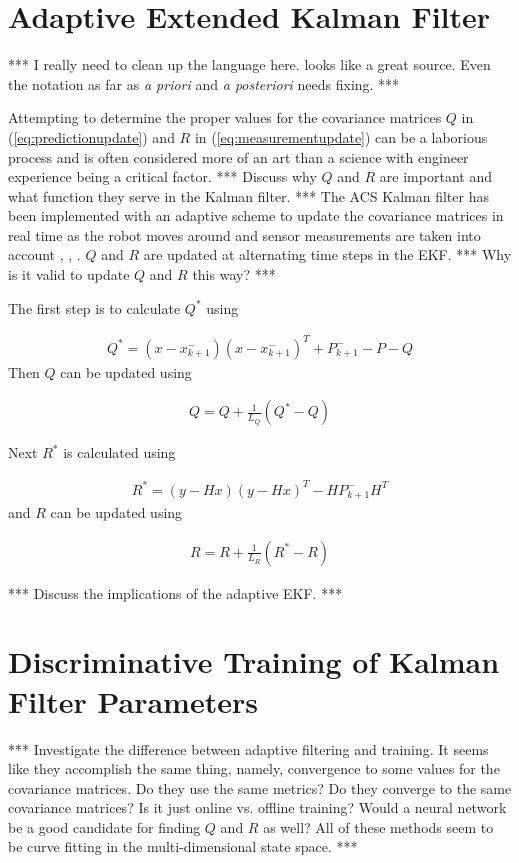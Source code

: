 \section{Adaptive Extended Kalman Filter}
\label{sec:adaptiveekf}
*** I really need to clean up the language here. \cite{Busse03adaptiveEKF} looks like a great source. Even the notation as far as \textit{a priori} and \textit{a posteriori} needs fixing. ***

Attempting to determine the proper values for the covariance matrices $Q$ in (\ref{eq:predictionupdate}) and $R$ in (\ref{eq:measurementupdate}) can be a laborious process and is often considered more of an art than a science with engineer experience being a critical factor. *** Discuss why $Q$ and $R$ are important and what function they serve in the Kalman filter. *** The ACS Kalman filter has been implemented with an adaptive scheme to update the covariance matrices in real time as the robot moves around and sensor measurements are taken into account \cite{Sights06}, \cite{Mehra72}, \cite{Busse03adaptiveEKF}. $Q$ and $R$ are updated at alternating time steps in the EKF. *** Why is it valid to update $Q$ and $R$ this way? ***

The first step is to calculate $Q^\ast$ using

\begin{align}
\label{eq:qstar}
Q^\ast = \left(x-x_{k+1}^-\right)\left(x-x_{k+1}^-\right)^T + P_{k+1}^- - P - Q
\end{align}
Then $Q$ can be updated using

\begin{align}
\label{eq:q}
Q = Q + \frac{1}{L_Q}\left(Q^\ast-Q\right)
\end{align}

Next $R^\ast$ is calculated using

\begin{align}
\label{eq:rstar}
R^\ast = \left(y-Hx\right)\left(y-Hx\right)^T - HP_{k+1}^-H^T
\end{align}
and $R$ can be updated using

\begin{align}
\label{eq:r}
R = R + \frac{1}{L_R}\left(R^\ast-R\right)
\end{align}

*** Discuss the implications of the adaptive EKF. ***

\section{Discriminative Training of Kalman Filter Parameters}
\label{sec:trainingkfparams}
*** Investigate the difference between adaptive filtering and training. It seems like they accomplish the same thing, namely, convergence to some values for the covariance matrices. Do they use the same metrics? Do they converge to the same covariance matrices? Is it just online vs. offline training? Would a neural network be a good candidate for finding $Q$ and $R$ as well? All of these methods seem to be curve fitting in the multi-dimensional state space. ***

